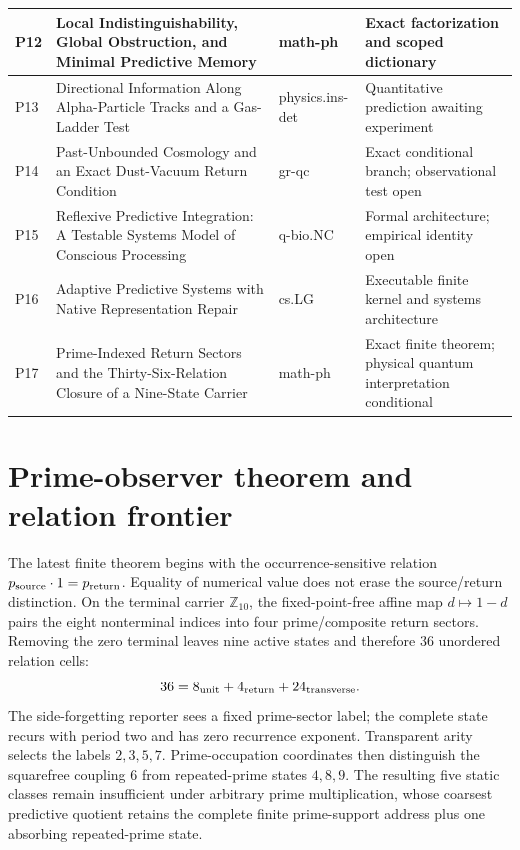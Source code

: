 \documentclass[11pt,a4paper]{article}
\begin{document}
\begin{longtable}{|p{.055\linewidth}|p{.46\linewidth}|p{.12\linewidth}|p{.25\linewidth}|}
P12 & Local Indistinguishability, Global Obstruction, and Minimal Predictive Memory & math-ph & Exact factorization and scoped dictionary \\ \hline
P13 & Directional Information Along Alpha-Particle Tracks and a Gas-Ladder Test & physics.ins-det & Quantitative prediction awaiting experiment \\ \hline
P14 & Past-Unbounded Cosmology and an Exact Dust-Vacuum Return Condition & gr-qc & Exact conditional branch; observational test open \\ \hline
P15 & Reflexive Predictive Integration: A Testable Systems Model of Conscious Processing & q-bio.NC & Formal architecture; empirical identity open \\ \hline
P16 & Adaptive Predictive Systems with Native Representation Repair & cs.LG & Executable finite kernel and systems architecture \\ \hline
P17 & Prime-Indexed Return Sectors and the Thirty-Six-Relation Closure of a Nine-State Carrier & math-ph & Exact finite theorem; physical quantum interpretation conditional \\ \hline
\end{longtable}

\section{Prime-observer theorem and relation frontier}
The latest finite theorem begins with the occurrence-sensitive relation $p_{\rm source}\cdot1=p_{\rm return}$. Equality of numerical value does not erase the source/return distinction. On the terminal carrier $\mathbb Z_{10}$, the fixed-point-free affine map $d\mapsto1-d$ pairs the eight nonterminal indices into four prime/composite return sectors. Removing the zero terminal leaves nine active states and therefore 36 unordered relation cells:
\begin{equation}
36=8_{\rm unit}+4_{\rm return}+24_{\rm transverse}.
\end{equation}
The side-forgetting reporter sees a fixed prime-sector label; the complete state recurs with period two and has zero recurrence exponent. Transparent arity selects the labels $2,3,5,7$. Prime-occupation coordinates then distinguish the squarefree coupling $6$ from repeated-prime states $4,8,9$. The resulting five static classes remain insufficient under arbitrary prime multiplication, whose coarsest predictive quotient retains the complete finite prime-support address plus one absorbing repeated-prime state.
\end{document}
